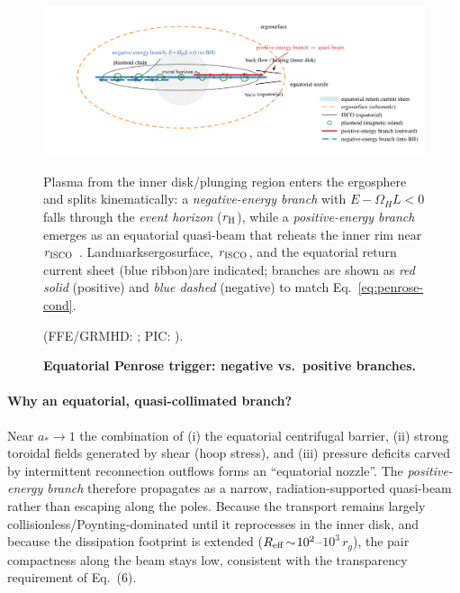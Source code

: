 \documentclass[twocolumn]{aastex701}
\begin{document}
\begin{figure}[p!]
  \centering
  \includegraphics[width=\textwidth]{fig_equatorial_trigger_schematic.pdf}
  \caption{\textbf{Equatorial Penrose trigger: negative vs.\ positive branches.}}
  Plasma from the inner disk/plunging region enters the ergosphere and splits kinematically:
  a \emph{negative-energy branch} with $E-\Omega_H L<0$ falls through the \emph{event horizon} ($r_{\rm H}$),
  while a \emph{positive-energy branch} emerges as an equatorial quasi-beam that reheats the inner rim near $r_{\rm ISCO}$ \citep{Penrose1969,Penrose2002}.
  Landmarks\textemdash{}ergosurface, $r_{\rm ISCO}$, and the equatorial return current sheet (blue ribbon)\textemdash{}are indicated; branches are shown as \emph{red solid} (positive) and \emph{blue dashed} (negative) to match Eq.~\eqref{eq:penrose-cond}.
  
  {\footnotesize(FFE/GRMHD: \citealt{Komissarov2004MNRAS,EastYang2018PRD,Pan2018PRD};
                 PIC: \citealt{Parfrey2019PRL,Bransgrove2021PRL}).}
  \label{fig:equatorial_trigger}
\end{figure}
\FloatBarrier

\paragraph{Why an equatorial, quasi-collimated branch?}
Near $a_*\!\to\!1$ the combination of (i) the equatorial centrifugal barrier,
(ii) strong toroidal fields generated by shear (hoop stress), and
(iii) pressure deficits carved by intermittent reconnection outflows
forms an ``equatorial nozzle''. The \emph{positive-energy branch} therefore propagates as a
narrow, radiation-supported quasi-beam rather than escaping along the poles.
Because the transport remains largely collisionless/Poynting-dominated until
it reprocesses in the inner disk, and because the dissipation footprint is
extended ($R_{\rm eff}\!\sim\!10^{2}$--$10^{3}\,r_g$), the pair compactness
along the beam stays low, consistent with the transparency requirement of Eq.~(6).
\end{document}
